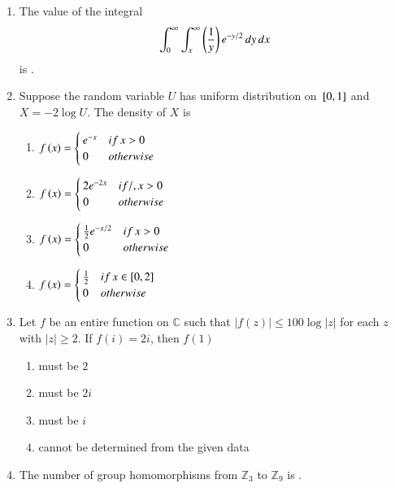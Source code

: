 \documentclass[journal]{IEEEtran}
\begin{document}
\begin{enumerate}
\item The value of the integral
\[
\int_0^{\infty} \int_x^{\infty}  \left(\frac{1}{y}\right) e^{-y/2} \, dy \, dx
\]
is \underline{\hspace{2cm}}.
\\
\item Suppose the random variable $U$ has uniform distribution on ${}\left[0,1\right]$ and $ X = -2 \log U $. The density of $X$ is
\begin{enumerate}
    \item $ f\left(x\right) = \begin{cases} e^{-x} & if\, x > 0 \\ 0 & otherwise \end{cases} $
    \item $ f\left(x\right) = \begin{cases} 2e^{-2x} & if/, x > 0 \\ 0 & otherwise \end{cases} $
    \item $ f\left(x\right) = \begin{cases} \frac{1}{2} e^{-x/2} & if\,  x > 0 \\ 0 & otherwise \end{cases} $
    \item $ f\left(x\right) = \begin{cases} \frac{1}{2} & if\, x \in [0, 2] \\ 0 & otherwise \end{cases}\\ $
\end{enumerate}
\item  Let  $f$  be an entire function on $ \mathbb{C} $ such that $ |f(z)| \leq 100 \log |z| $ for each $ z $ with $ |z| \geq 2 $. If $ f(i) = 2i $, then $ f(1) $
\begin{enumerate}
    \item must be $2$ 
    \item must be $2i$
    \item must be $i$ 
    \item cannot be determined from the given data
\end{enumerate}
\item The number of group homomorphisms from $ \mathbb{Z}_{3} $ to $ \mathbb{Z}_{9} $ is \underline{\hspace{2cm}}.
\end{enumerate}
\end{document}
